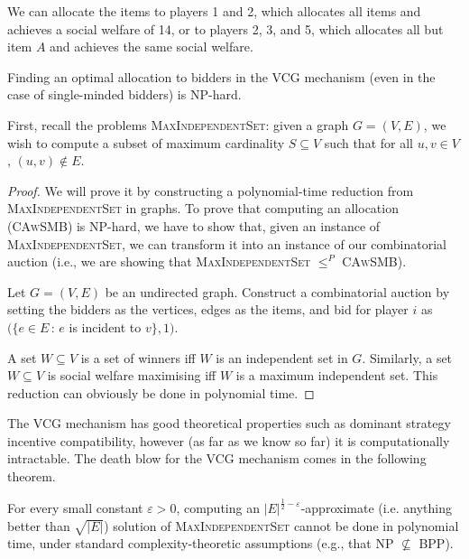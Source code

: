 We can allocate the items to players 1 and 2, which allocates all items and
achieves a social welfare of 14, or to players 2, 3, and 5, which allocates all
but item $A$ and achieves the same social welfare.

\begin{theorem}
	Finding an optimal allocation to bidders in the VCG mechanism (even in the
	case of single-minded bidders) is NP-hard.
\end{theorem}

First, recall the problems \textsc{MaxIndependentSet}: given a graph $G =
(V,E)$, we wish to compute a subset of maximum cardinality $S \subseteq V$ such
that for all $u,v \in V$, $(u,v) \not \in E$.

\begin{proof}
	We will prove it by constructing a polynomial-time reduction from
	\textsc{MaxIndependentSet} in graphs. To prove that computing an allocation
	(\textsc{CAwSMB}) is NP-hard, we have to show that, given an instance of
	\textsc{MaxIndependentSet}, we can transform it into an instance of our
	combinatorial auction (i.e., we are showing that \textsc{MaxIndependentSet}
	$\le^P$ \textsc{CAwSMB}).

	Let $G=(V,E)$ be an undirected graph. Construct a combinatorial auction by
	setting the bidders as the vertices, edges as the items, and bid for player
	$i$ as $(\{e \in E \, : \, e$ is incident to $v \}, 1)$.

	A set $W \subseteq V$ is a set of winners iff $W$ is an independent set in
	$G$. Similarly, a set $W \subseteq V$ is social welfare maximising iff $W$
	is a maximum independent set. This reduction can obviously be done in
	polynomial time.
\end{proof}

The VCG mechanism has good theoretical properties such as dominant strategy
incentive compatibility, however (as far as we know so far) it is
computationally intractable. The death blow for the VCG mechanism comes in the
following theorem.

\begin{theorem}
	\label{thm:maxIndSetInapproximability}
	For every small constant $\varepsilon >0$, computing an
	$|E|^{\frac{1}{2} - \varepsilon}$-approximate (i.e.
	anything better than $\sqrt{|E|}$) solution of
	\textsc{MaxIndependentSet} cannot be done in polynomial
	time, under standard complexity-theoretic assumptions
	(e.g., that NP $\not \subseteq$ BPP).
\end{theorem}

